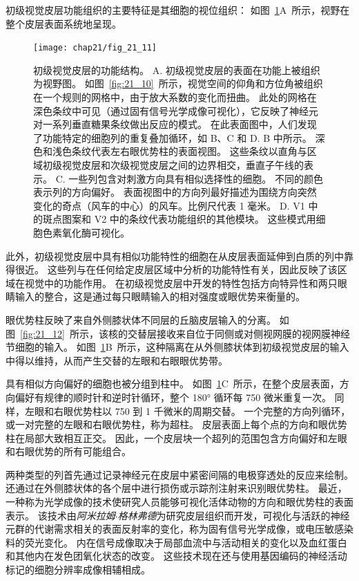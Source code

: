 初级视觉皮层功能组织的主要特征是其细胞的视位组织：
如图~\ref{fig:21_11}A~所示，视野在整个皮层表面系统地呈现。


\begin{figure}[htbp]
	\centering
	\texttt{[image: chap21/fig\_21\_11]}
	\caption{初级视觉皮层的功能结构。
		A. 初级视觉皮层的表面在功能上被组织为视野图。 
		如图~\ref{fig:21_10}~所示，视觉空间的仰角和方位角被组织在一个规则的网格中，由于放大系数的变化而扭曲。
		此处的网格在深色条纹中可见（通过固有信号光学成像可视化），它反映了神经元对一系列垂直糖果条纹做出反应的模式。
		在此表面图中，人们发现了功能特定的细胞列的重复叠加循环，如 B、C 和 D. B 中所示。
		深色和浅色条纹代表左右眼优势柱的表面视图。
		这些条纹以直角与区域初级视觉皮层和次级视觉皮层之间的边界相交，垂直子午线的表示。
		C. 一些列包含对刺激方向具有相似选择性的细胞。 
		不同的颜色表示列的方向偏好。
		表面视图中的方向列最好描述为围绕方向突然变化的奇点（风车的中心）的风车。比例尺代表 1 毫米。
		D. V1 中的斑点图案和 V2 中的条纹代表功能组织的其他模块。
		这些模式用细胞色素氧化酶可视化。}
	\label{fig:21_11}
\end{figure}


此外，初级视觉皮层中具有相似功能特性的细胞在从皮层表面延伸到白质的列中靠得很近。
这些列与在任何给定皮层区域中分析的功能特性有关，因此反映了该区域在视觉中的功能作用。
在初级视觉皮层中开发的特性包括方向特异性和两只眼睛输入的整合，这是通过每只眼睛输入的相对强度或眼优势来衡量的。


眼优势柱反映了来自外侧膝状体不同层的丘脑皮层输入的分离。
如图~\ref{fig:21_12}~所示，该核的交替层接收来自位于同侧或对侧视网膜的视网膜神经节细胞的输入。
如图~\ref{fig:21_11}B~所示，这种隔离在从外侧膝状体到初级视觉皮层的输入中得以维持，从而产生交替的左眼和右眼眼优势带。


具有相似方向偏好的细胞也被分组到柱中。
如图~\ref{fig:21_11}C~所示，在整个皮层表面，方向偏好有规律的顺时针和逆时针循环，整个 180° 循环每 750 微米重复一次。
同样，左眼和右眼优势柱以 750 到 1 千微米的周期交替。
一个完整的方向列循环，或一对完整的左眼和右眼优势柱，称为超柱。
皮层表面上每个点的方向和眼优势柱在局部大致相互正交。
因此，一个皮层块一个超列的范围包含方向偏好和左眼和右眼优势的所有可能组合。


两种类型的列首先通过记录神经元在皮层中紧密间隔的电极穿透处的反应来绘制。
还通过在外侧膝状体的各个层中进行损伤或示踪剂注射来识别眼优势柱。
最近，一种称为光学成像的技术使研究人员能够可视化活体动物的方向和眼优势柱的表面表示。 
该技术由\textit{阿米拉姆$\cdot$格林弗德}为研究皮层组织而开发，可视化与活跃的神经元群的代谢需求相关的表面反射率的变化，称为固有信号光学成像，或电压敏感染料的荧光变化。 
内在信号成像取决于局部血流中与活动相关的变化以及血红蛋白和其他内在发色团氧化状态的改变。 
这些技术现在还与使用基因编码的神经活动标记的细胞分辨率成像相辅相成。


